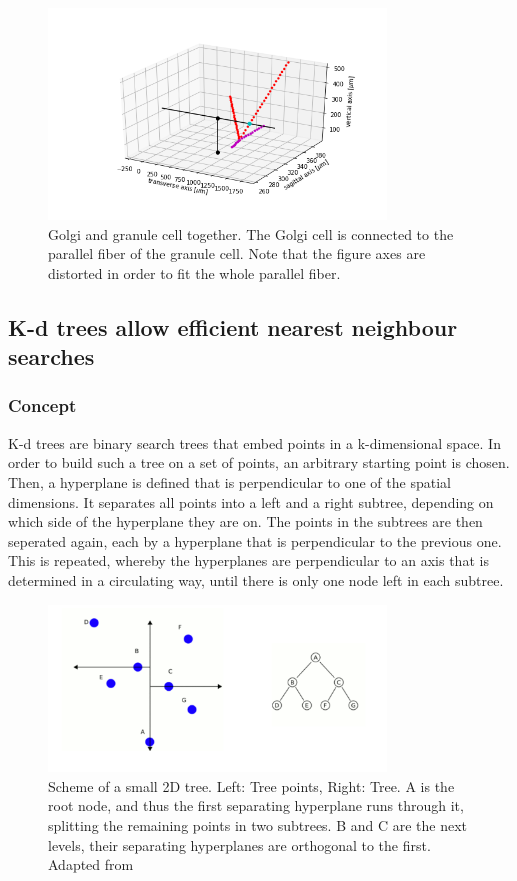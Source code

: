 \documentclass[12pt]{report}
\begin{document}
\begin{figure}[!ht]
	\centering
	\includegraphics[width=0.8\textwidth]{./figures/pf_gol_con_single.png}
	\caption{Golgi and granule cell together. The Golgi cell is connected to the parallel fiber of the granule cell. Note that the figure axes are distorted in order to fit the whole parallel fiber.}
	\centering
	\label{f:gol_gran_con}
\end{figure}


\subsection{K-d trees allow efficient nearest neighbour searches}

\subsubsection{Concept}
K-d trees \cite{r:Bentley75} are binary search trees that embed points in a k-dimensional space. 
In order to build such a tree on a set of points, an arbitrary starting point is chosen. Then, a hyperplane is defined that is perpendicular to one of the spatial dimensions. It separates all points into a left and a right subtree, depending on which side of the hyperplane they are on. The points in the subtrees are then seperated again, each by a hyperplane that is perpendicular to the previous one. This is repeated, whereby the hyperplanes are perpendicular to an axis that is determined in a circulating way, until there is only one node left in each subtree.

\begin{figure}[!ht]
	\centering
	\includegraphics[width=0.8\textwidth]{./figures/kd_tree2.png}
	\caption{Scheme of a small 2D tree. Left: Tree points, Right: Tree. A is the root node, and thus the first separating hyperplane runs through it, splitting the remaining points in two subtrees. B and C are the next levels, their separating hyperplanes are orthogonal to the first. Adapted from \cite{r:kdt}}
	\centering
	\label{f:kdt}
\end{figure}
\end{document}
